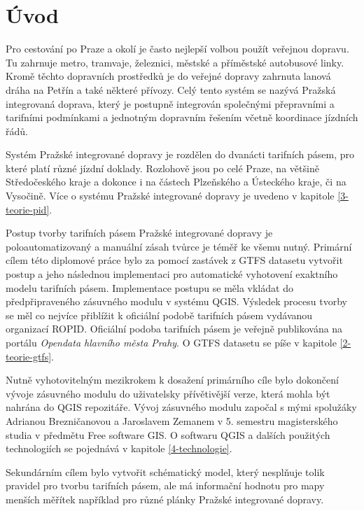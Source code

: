 \chapter*{Úvod}
\label{0-uvod}

Pro cestování po Praze a okolí je často nejlepší volbou použít veřejnou dopravu.
Tu zahrnuje metro, tramvaje, železnici, městské a příměstské autobusové linky.
Kromě těchto dopravních prostředků je do veřejné dopravy zahrnuta lanová dráha na Petřín a také některé přívozy. 
Celý tento systém se nazývá Pražská integrovaná doprava, který je postupně integrován společnými přepravními
a tarifními podmínkami a jednotným dopravním řešením včetně koordinace jízdních řádů.

Systém Pražské integrované dopravy je rozdělen do dvanácti tarifních pásem, pro
které platí různé jízdní doklady. Rozlohově jsou po celé Praze, na většině
Středočeského kraje a dokonce i na částech Plzeňského a Ústeckého kraje, či na Vysočině.
Více o systému Pražské integrované dopravy je uvedeno v kapitole \ref{3-teorie-pid}.

Postup tvorby tarifních pásem Pražské integrované dopravy je poloautomatizovaný
a manuální zásah tvůrce je téměř ke všemu nutný.
Primární cílem této diplomové práce bylo za pomocí zastávek z GTFS datasetu vytvořit 
postup a jeho následnou implementaci pro automatické vyhotovení exaktního modelu tarifních pásem.
Implementace postupu se měla vkládat do předpřipraveného zásuvného modulu v systému QGIS.
Výsledek procesu tvorby se měl co nejvíce přiblížit k oficiální podobě tarifních pásem
vydávanou organizací ROPID. 
Oficiální podoba tarifních pásem je veřejně publikována na portálu \textit{Opendata hlavního města Prahy}.
O GTFS datasetu se píše v kapitole \ref{2-teorie-gtfs}.

Nutně vyhotovitelným mezikrokem k dosažení primárního cíle bylo dokončení
vývoje zásuvného modulu do uživatelsky přívětivější verze, která mohla být nahrána do QGIS repozitáře.
Vývoj zásuvného modulu započal s mými spolužáky Adrianou Brezničanovou a Jaroslavem
Zemanem v 5. semestru magisterského studia v předmětu Free software GIS.
O softwaru QGIS a dalších použitých technologiích se pojednává v kapitole \ref{4-technologie}. 

Sekundárním cílem bylo vytvořit schématický model, který nesplňuje tolik
pravidel pro tvorbu tarifních pásem, ale má informační hodnotu pro mapy menších měřítek
například pro různé plánky Pražské integrované dopravy.

